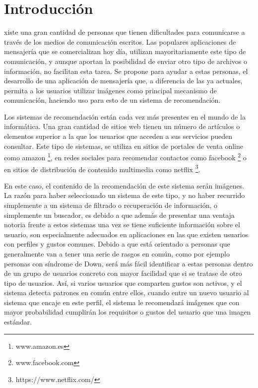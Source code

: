 \chapter{Introducción}
\label{chap:intro}

\noindent
{}xiste una gran cantidad de personas que tienen dificultades para comunicarse a través de los medios de comunicación escritos. Las populares aplicaciones de mensajería que se comercializan hoy día, utilizan mayoritariamente este tipo de comunicación, y aunque  aportan la posibilidad de enviar otro tipo de archivos o información, no facilitan esta tarea. Se propone para ayudar a estas personas, el desarrollo de una aplicación de mensajería que, a diferencia de las ya actuales, permita a los usuarios utilizar imágenes como principal mecanismo de comunicación, haciendo uso para esto de un sistema de recomendación. 


Los sistemas de recomendación están cada vez más presentes en el mundo de la informática. Una gran cantidad de sitios web tienen un número de artículos o elementos superior a la que los usuarios que acceden a sus servicios pueden consultar. Este tipo de sistemas, se utiliza en sitios de portales de venta online como amazon \footnote{www.amazon.es}, en redes sociales para recomendar contactos como facebook \footnote{www.facebook.com} o en sitios de distribución de contenido multimedia como netflix \footnote{https://www.netflix.com/}. 

En este caso, el contenido de la recomendación de este sistema serán imágenes. La razón para haber seleccionado un sistema de este tipo, y no haber recurrido simplemente a un sistema de filtrado o recuperación de información, o simplemente un buscador, es debido a que además de presentar una ventaja notoria frente a estos sistemas una vez se tiene suficiente información sobre el usuario, son especialmente adecuados en aplicaciones en las que existen usuarios con perfiles y gustos comunes. Debido a que está orientado a personas que generalmente van a tener una serie de rasgos en común, como por ejemplo personas con síndrome de Down, será más fácil identificar a estas personas dentro de un grupo de usuarios concreto con mayor facilidad que si se tratase de otro tipo de usuarios. Así, si varios usuarios que comparten gustos son activos, y el sistema detecta patrones en común entre ellos, cuando entre un nuevo usuario al sistema que encaje en este perfil, el sistema le recomendará imágenes que con mayor probabilidad cumplirán los requisitos o gustos del usuario que una imagen estándar. 


